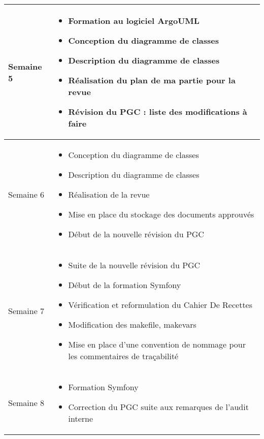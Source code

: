 \documentclass [a4paper] {article}
\begin{document}
\section*{\Mathieu}

\begin{tabularx}{16.8cm}{|>{\columncolor{gray!40}}l|X|}
	\hline
	Semaine 5 & 
	\begin{itemize}
		\item Formation au logiciel ArgoUML
		\item Conception du diagramme de classes
		\item Description du diagramme de classes
		\item Réalisation du plan de ma partie pour la revue
		\item Révision du PGC : liste des modifications à faire
	\end{itemize} \\
	\hline
	Semaine 6 & 
	\begin{itemize}
		\item Conception du diagramme de classes
		\item Description du diagramme de classes
		\item Réalisation de la revue
		\item Mise en place du stockage des documents approuvés
		\item Début de la nouvelle révision du PGC
	\end{itemize} \\
	\hline
	Semaine 7 & 
	\begin{itemize}
		\item Suite de la nouvelle révision du PGC
		\item Début de la formation Symfony
		\item Vérification et reformulation du Cahier De Recettes
		\item Modification des makefile, makevars
		\item Mise en place d'une convention de nommage pour les commentaires de traçabilité
	\end{itemize} \\
	\hline	
	Semaine 8 & 
	\begin{itemize}
		\item Formation Symfony
		\item Correction du PGC suite aux remarques de l'audit interne
	\end{itemize} \\
	\hline
\end{tabularx}
\end{document}
